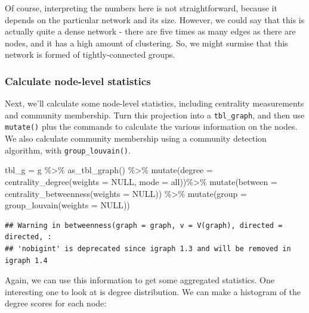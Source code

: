\documentclass[
]{book}
\newenvironment{Shaded}{\begin{snugshade}}{\end{snugshade}}
\newcommand{\AttributeTok}[1]{\textcolor[rgb]{0.77,0.63,0.00}{#1}}
\newcommand{\ConstantTok}[1]{\textcolor[rgb]{0.00,0.00,0.00}{#1}}
\newcommand{\FunctionTok}[1]{\textcolor[rgb]{0.00,0.00,0.00}{#1}}
\newcommand{\NormalTok}[1]{#1}
\newcommand{\OtherTok}[1]{\textcolor[rgb]{0.56,0.35,0.01}{#1}}
\newcommand{\SpecialCharTok}[1]{\textcolor[rgb]{0.00,0.00,0.00}{#1}}
\newcommand{\StringTok}[1]{\textcolor[rgb]{0.31,0.60,0.02}{#1}}
\begin{document}
Of course, interpreting the numbers here is not straightforward, because it depends on the particular network and its size. However, we could say that this is actually quite a dense network - there are five times as many edges as there are nodes, and it has a high amount of clustering. So, we might surmise that this network is formed of tightly-connected groups.

\hypertarget{calculate-node-level-statistics}{%
\subsubsection{Calculate node-level statistics}\label{calculate-node-level-statistics}}

Next, we'll calculate some node-level statistics, including centrality measurements and community membership. Turn this projection into a \texttt{tbl\_graph}, and then use \texttt{mutate()} plus the commands to calculate the various information on the nodes. We also calculate community membership using a community detection algorithm, with \texttt{group\_louvain()}.

\begin{Shaded}
\begin{Highlighting}[]
\NormalTok{tbl\_g }\OtherTok{=}\NormalTok{ g }\SpecialCharTok{\%\textgreater{}\%} \FunctionTok{as\_tbl\_graph}\NormalTok{() }\SpecialCharTok{\%\textgreater{}\%} 
  \FunctionTok{mutate}\NormalTok{(}\AttributeTok{degree =} \FunctionTok{centrality\_degree}\NormalTok{(}\AttributeTok{weights =} \ConstantTok{NULL}\NormalTok{, }\AttributeTok{mode =} \StringTok{\textquotesingle{}all\textquotesingle{}}\NormalTok{))}\SpecialCharTok{\%\textgreater{}\%} 
  \FunctionTok{mutate}\NormalTok{(}\AttributeTok{between =} \FunctionTok{centrality\_betweenness}\NormalTok{(}\AttributeTok{weights =} \ConstantTok{NULL}\NormalTok{)) }\SpecialCharTok{\%\textgreater{}\%} 
  \FunctionTok{mutate}\NormalTok{(}\AttributeTok{group =} \FunctionTok{group\_louvain}\NormalTok{(}\AttributeTok{weights =} \ConstantTok{NULL}\NormalTok{))}
\end{Highlighting}
\end{Shaded}

\begin{verbatim}
## Warning in betweenness(graph = graph, v = V(graph), directed = directed, :
## 'nobigint' is deprecated since igraph 1.3 and will be removed in igraph 1.4
\end{verbatim}

Again, we can use this information to get some aggregated statistics. One interesting one to look at is degree distribution. We can make a histogram of the degree scores for each node:
\end{document}
